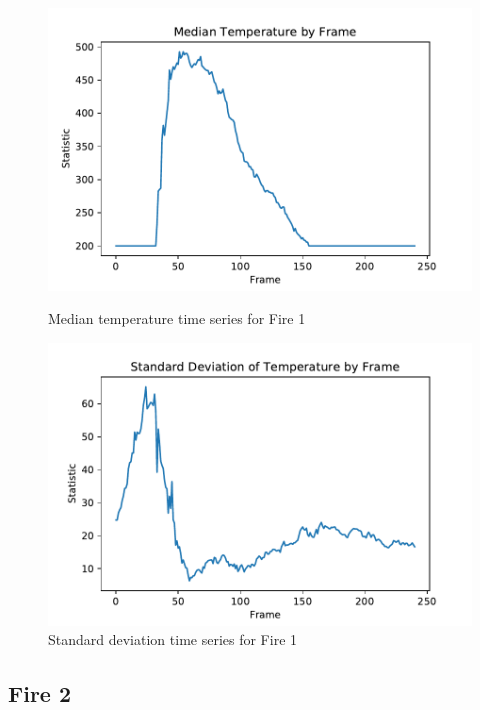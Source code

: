 \documentclass{article}
\begin{document}
\begin{figure}[ht]
\begin{minipage}[b]{0.5\linewidth}
    \includegraphics[width=1.1\linewidth]{../plots/f1_mediantemp.pdf} 
    \caption{Median temperature time series for Fire 1} 
    \vspace{4ex}
  \end{minipage}%
  \begin{minipage}[b]{0.5\linewidth}
    \centering
    \includegraphics[width=1.1\linewidth]{../plots/f1_stdtemp.pdf} 
    \caption{Standard deviation time series for Fire 1} 
    \vspace{4ex}
  \end{minipage} 
\end{figure}

\subsection{Fire 2}
\end{document}
